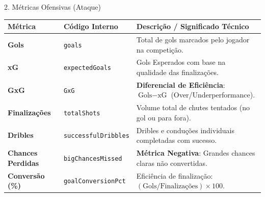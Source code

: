 \documentclass[aspectratio=169, 10pt]{beamer}
\begin{document}
\begin{frame}{2. Métricas Ofensivas (Ataque)}
  \begin{table}
    \centering
    \small
    \begin{tabular}{lll}
      \toprule
      \textbf{Métrica} & \textbf{Código Interno} & \textbf{Descrição / Significado Técnico} \\
      \midrule
      \textbf{Gols} & \texttt{goals} & Total de gols marcados pelo jogador na competição. \\
      \textbf{xG} & \texttt{expectedGoals} & Gols Esperados com base na qualidade das finalizações. \\
      \rowcolor{lightgray}
      \textbf{GxG} & \texttt{GxG} & \textbf{Diferencial de Eficiência}: $\text{Gols} - \text{xG}$ (Over/Underperformance). \\
      \textbf{Finalizações} & \texttt{totalShots} & Volume total de chutes tentados (no gol ou para fora). \\
      \textbf{Dribles} & \texttt{successfulDribbles} & Dribles e conduções individuais completadas com sucesso. \\
      \rowcolor{lightgray}
      \textbf{Chances Perdidas} & \texttt{bigChancesMissed} & \textbf{Métrica Negativa}: Grandes chances claras não convertidas. \\
      \textbf{Conversão (\%)} & \texttt{goalConversionPct} & Eficiência de finalização: $(\text{Gols} / \text{Finalizações}) \times 100$. \\
      \bottomrule
    \end{tabular}
  \end{table}
\end{frame}
\end{document}
